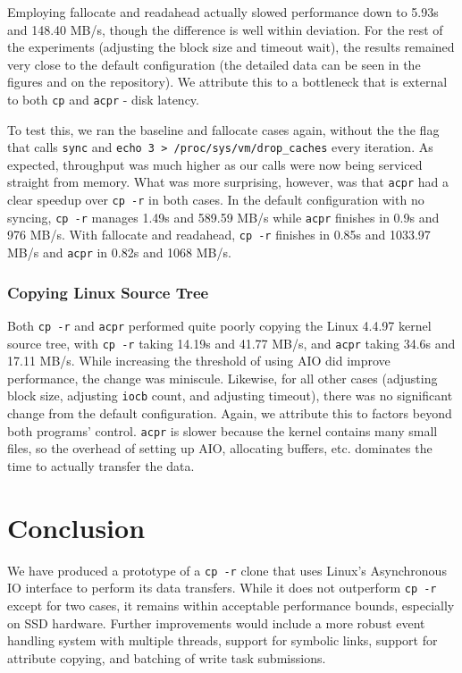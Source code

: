 \documentclass[11pt]{article}
\begin{document}
Employing fallocate and readahead actually slowed performance down to 5.93s and 148.40 MB/s, though the difference is well within deviation. For the rest of the experiments (adjusting the block size and timeout wait), the results remained very close to the default configuration (the detailed data can be seen in the figures and on the repository). We attribute this to a bottleneck that is external to both \texttt{cp} and \texttt{acpr} - disk latency. 

To test this, we ran the baseline and fallocate cases again, without the the flag that calls \texttt{sync} and \texttt{echo 3 > /proc/sys/vm/drop\_caches} every iteration. As expected, throughput was much higher as our calls were now being serviced straight from memory. What was more surprising, however, was that \texttt{acpr} had a clear speedup over \texttt{cp -r} in both cases. In the default configuration with no syncing, \texttt{cp -r} manages 1.49s and 589.59 MB/s while \texttt{acpr} finishes in 0.9s and 976 MB/s. With fallocate and readahead, \texttt{cp -r} finishes in 0.85s and 1033.97 MB/s and \texttt{acpr} in 0.82s and 1068 MB/s.

\subsubsection{Copying Linux Source Tree}
Both \texttt{cp -r} and \texttt{acpr} performed quite poorly copying the Linux 4.4.97 kernel source tree, with \texttt{cp -r} taking 14.19s and 41.77 MB/s, and \texttt{acpr} taking 34.6s and 17.11 MB/s. While increasing the threshold of using AIO did improve performance, the change was miniscule. Likewise, for all other cases (adjusting block size, adjusting \texttt{iocb} count, and adjusting timeout), there was no significant change from the default configuration. Again, we attribute this to factors beyond both programs' control. \texttt{acpr} is slower because the kernel contains many small files, so the overhead of setting up AIO, allocating buffers, etc. dominates the time to actually transfer the data.

\section{Conclusion}
We have produced a prototype of a \texttt{cp -r} clone that uses Linux's Asynchronous IO interface to perform its data transfers. While it does not outperform \texttt{cp -r} except for two cases, it remains within acceptable performance bounds, especially on SSD hardware. Further improvements would include a more robust event handling system with multiple threads, support for symbolic links, support for attribute copying, and batching of write task submissions.
\end{document}
